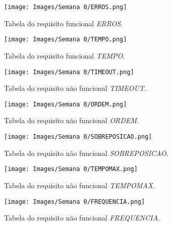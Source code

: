 \documentclass[amsmath,amssymb,floatfix]{report}
\begin{document}
\begin{figure}[H]
\centering
\texttt{[image: Images/Semana 0/ERROS.png]} 
    \caption{Tabela do requisito funcional \textit{ERROS}.}
    \label{fig:erros}
\end{figure}

\begin{figure}[H]
\centering
\texttt{[image: Images/Semana 0/TEMPO.png]} 
    \caption{Tabela do requisito funcional \textit{TEMPO}.}
    \label{fig:tempo}
\end{figure}

\begin{figure}[H]
\centering
\texttt{[image: Images/Semana 0/TIMEOUT.png]} 
    \caption{Tabela do requisito não funcional \textit{TIMEOUT}.}
    \label{fig:timeout}
\end{figure}

\begin{figure}[H]
\centering
\texttt{[image: Images/Semana 0/ORDEM.png]} 
    \caption{Tabela do requisito não funcional \textit{ORDEM}.}
    \label{fig:ordem}
\end{figure}

\begin{figure}[H]
\centering
\texttt{[image: Images/Semana 0/SOBREPOSICAO.png]} 
    \caption{Tabela do requisito não funcional \textit{SOBREPOSICAO}.}
    \label{fig:sobreposicao}
\end{figure}

\begin{figure}[H]
\centering
\texttt{[image: Images/Semana 0/TEMPOMAX.png]} 
    \caption{Tabela do requisito não funcional \textit{TEMPOMAX}.}
    \label{fig:tempomax}
\end{figure}

\begin{figure}[H]
\centering
\texttt{[image: Images/Semana 0/FREQUENCIA.png]} 
    \caption{Tabela do requisito não funcional \textit{FREQUENCIA}.}
    \label{fig:frequencia}
\end{figure}
\end{document}
